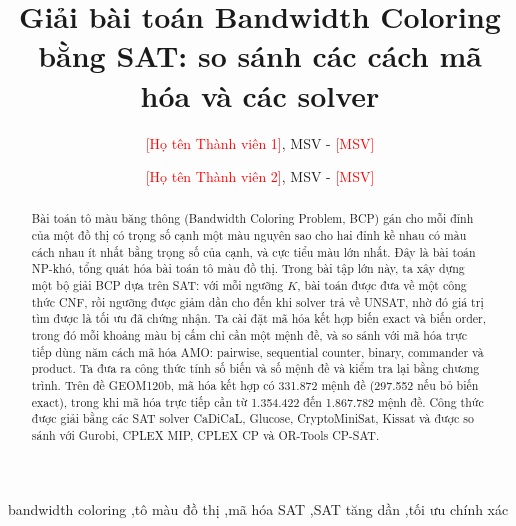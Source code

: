 \documentclass[a4paper,fleqn]{cas-sc}
\newcommand{\TODO}[1]{\textcolor{red}{[#1]}}
\newcommand{\AuthorOne}{\TODO{Họ tên Thành viên 1}}\newcommand{\IDOne}{\TODO{MSV}}\newcommand{\EmailOne}{\TODO{email}}
\newcommand{\AuthorTwo}{\TODO{Họ tên Thành viên 2}}\newcommand{\IDTwo}{\TODO{MSV}}\newcommand{\EmailTwo}{\TODO{email}}
\newcommand{\AutoAbstract}{}\newcommand{\AutoCfg}{}\newcommand{\AutoSolvers}{}
\begin{document}
\let\WriteBookmarks\relax
\def\floatpagepagefraction{1}
\def\textpagefraction{.001}

\shortauthors{\AuthorOne, \AuthorTwo}

\title [mode = title]{Giải bài toán Bandwidth Coloring bằng SAT: so sánh các cách mã hóa và các solver}

\author{\AuthorOne, MSV - \IDOne}

\author{\AuthorTwo, MSV - \IDTwo}

\begin{abstract}
Bài toán tô màu băng thông (Bandwidth Coloring Problem, BCP) gán cho mỗi đỉnh của một đồ thị có trọng số cạnh một màu nguyên sao cho hai đỉnh kề nhau có màu cách nhau ít nhất bằng trọng số của cạnh, và cực tiểu màu lớn nhất. Đây là bài toán NP-khó, tổng quát hóa bài toán tô màu đồ thị. Trong bài tập lớn này, ta xây dựng một bộ giải BCP dựa trên SAT: với mỗi ngưỡng $K$, bài toán được đưa về một công thức CNF, rồi ngưỡng được giảm dần cho đến khi solver trả về UNSAT, nhờ đó giá trị tìm được là tối ưu đã chứng nhận. Ta cài đặt mã hóa kết hợp biến exact và biến order, trong đó mỗi khoảng màu bị cấm chỉ cần một mệnh đề, và so sánh với mã hóa trực tiếp dùng năm cách mã hóa AMO: pairwise, sequential counter, binary, commander và product. Ta đưa ra công thức tính số biến và số mệnh đề và kiểm tra lại bằng chương trình. Trên đề GEOM120b, mã hóa kết hợp có 331.872 mệnh đề (297.552 nếu bỏ biến exact), trong khi mã hóa trực tiếp cần từ 1.354.422 đến 1.867.782 mệnh đề. Công thức được giải bằng các SAT solver CaDiCaL, Glucose, CryptoMiniSat, Kissat và được so sánh với Gurobi, CPLEX MIP, CPLEX CP và OR-Tools CP-SAT. \AutoAbstract
\end{abstract}

\begin{keywords}
bandwidth coloring \sep tô màu đồ thị \sep mã hóa SAT \sep SAT tăng dần \sep tối ưu chính xác
\end{keywords}

\maketitle
\end{document}
